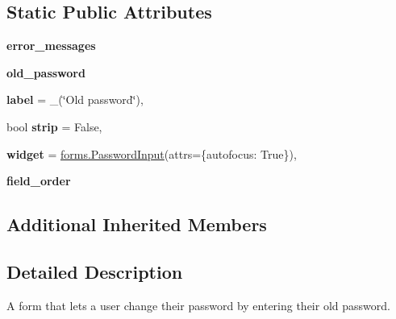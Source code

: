 \subsection*{Static Public Attributes}
\begin{DoxyCompactItemize}
\item 
\mbox{\label{classdjango_1_1contrib_1_1auth_1_1forms_1_1_password_change_form_a3e22d6457f37bfd5b060d215e2b36db4}} 
{\bfseries error\+\_\+messages}
\item 
\mbox{\label{classdjango_1_1contrib_1_1auth_1_1forms_1_1_password_change_form_a1d617b8a4260a35eda74340d281b33ad}} 
{\bfseries old\+\_\+password}
\item 
\mbox{\label{classdjango_1_1contrib_1_1auth_1_1forms_1_1_password_change_form_a657e08d6619587eb8fe4f606dcd69ace}} 
{\bfseries label} = \+\_\+(\char`\"{}Old password\char`\"{}),
\item 
\mbox{\label{classdjango_1_1contrib_1_1auth_1_1forms_1_1_password_change_form_ad8dd0b1f0a08b6cce66c24f9dd6ba34c}} 
bool {\bfseries strip} = False,
\item 
\mbox{\label{classdjango_1_1contrib_1_1auth_1_1forms_1_1_password_change_form_a09a835cf6aa5ccff1cbf5d8f1c422910}} 
{\bfseries widget} = \mbox{\hyperlink{classdjango_1_1forms_1_1widgets_1_1_password_input}{forms.\+Password\+Input}}(attrs=\{\textquotesingle{}autofocus\textquotesingle{}\+: True\}),
\item 
\mbox{\label{classdjango_1_1contrib_1_1auth_1_1forms_1_1_password_change_form_a8f75c832459c76c7bef8afd8b83fc037}} 
{\bfseries field\+\_\+order}
\end{DoxyCompactItemize}
\subsection*{Additional Inherited Members}


\subsection{Detailed Description}
\begin{DoxyVerb}A form that lets a user change their password by entering their old
password.
\end{DoxyVerb}
 

